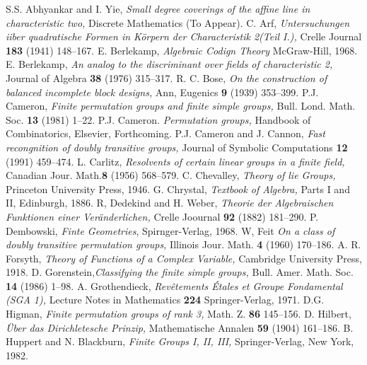 \begin{thebibliography}{99}
 S.S. Abhyankar and I. Yie, \textit{Small degree coverings of the affine line in characteristic two,} Discrete Mathematics (To Appear).
 C. Arf, \textit{Untersuchungen iiber quadratische Formen in K\"orpern der Characteristik 2(Teil I.),} Crelle Journal {\bf 183} (1941) 148--167. 
 E. Berlekamp, \textit{Algebraic Codign Theory} McGraw-Hill, 1968.
 E. Berlekamp, \textit{An analog to the discriminant over fields of characteristic 2,} Journal of Algebra {\bf 38} (1976) 315--317.
 R. C. Bose, \textit{On the construction of balanced incomplete block designs,} Ann, Eugenics {\bf 9} (1939) 353--399.
 P.J. Cameron, \textit{Finite permutation groups and finite simple groups,} Bull. Lond. Math. Soc. {\bf 13} (1981) 1--22.
 P.J. Cameron. \textit{Permutation groups,} Handbook of Combinatorics, Elsevier, Forthcoming.
 P.J. Cameron and J. Cannon, \textit{Fast recongnition of doubly transitive groups,} Journal of Symbolic Computations {\bf 12} (1991) 459--474.
 L. Carlitz, \textit{Resolvents of certain linear groups in a finite field,} Canadian Jour. Math.{\bf 8} (1956) 568--579.
 C. Chevalley, \textit{Theory of lie Groups,} Princeton University Press, 1946.  
 G. Chrystal, \textit{Textbook of Algebra,} Parts I and II, Edinburgh, 1886.
 R, Dedekind and H. Weber, \textit{Theorie der Algebraischen Funktionen einer Ver\"anderlichen,} Crelle Joournal {\bf 92} (1882) 181--290.
 P. Dembowski, \textit{Finte Geometries}, Spirnger-Verlag, 1968.
 W, Feit \textit{On a class of doubly transitive permutation groups,} Illinois Jour. Math. {\bf 4} (1960) 170--186.
 A. R. Forsyth, \textit{Theory of Functions of a Complex Variable,} Cambridge University Press, 1918.
 D. Gorenstein,\pageoriginale \textit{Classifying the finite simple groups,} Bull. Amer. Math. Soc. {\bf 14} (1986) 1--98.
 A. Grothendieck, \textit{Rev\^etements \'Etales et Groupe Fondamental (SGA 1),} Lecture Notes in Mathematics {\bf 224} Springer-Verlag, 1971.
 D.G. Higman, \textit{Finite permutation groups of rank 3,} Math. Z. {\bf 86} 145--156.
 D. Hilbert, \textit{\"Uber das Dirichletesche Prinzip,} Mathematische Annalen {\bf 59} (1904) 161--186.
 B. Huppert and N. Blackburn, \textit{Finite Groups I, II, III,} Springer-Verlag, New York, 1982.

\end{thebibliography}
